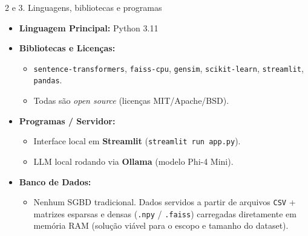 \documentclass[10pt, aspectratio=169]{beamer}
\begin{document}
\begin{frame}{2 e 3. Linguagens, bibliotecas e programas}
    \begin{itemize}
        \item \textbf{Linguagem Principal:} Python 3.11
        \vspace{0.1cm}
        \item \textbf{Bibliotecas e Licenças:} 
        \begin{itemize}
            \item \texttt{sentence-transformers}, \texttt{faiss-cpu}, \texttt{gensim}, \texttt{scikit-learn}, \texttt{streamlit}, \texttt{pandas}.
            \item Todas são \textit{open source} (licenças MIT/Apache/BSD).
        \end{itemize}
        \vspace{0.1cm}
        \item \textbf{Programas / Servidor:}
        \begin{itemize}
            \item Interface local em \textbf{Streamlit} (\texttt{streamlit run app.py}).
            \item LLM local rodando via \textbf{Ollama} (modelo Phi-4 Mini).
        \end{itemize}
        \vspace{0.1cm}
        \item \textbf{Banco de Dados:}
        \begin{itemize}
            \item Nenhum SGBD tradicional. Dados servidos a partir de arquivos \texttt{CSV} + matrizes esparsas e densas (\texttt{.npy} / \texttt{.faiss}) carregadas diretamente em memória RAM (solução viável para o escopo e tamanho do dataset).
        \end{itemize}
    \end{itemize}
\end{frame}
\end{document}
